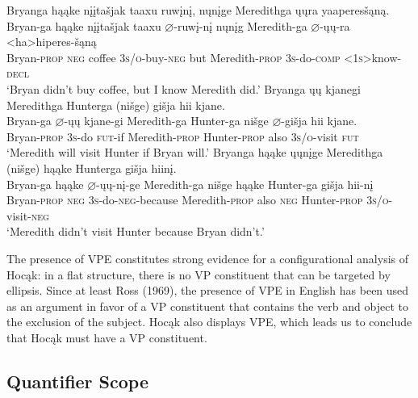 \documentclass[output=paper]{LSP/langsci}
\begin{document}
\begin{exe}
\ex
\begin{xlist}
\ex 
\glll Bryanga	h\k{a}\k{a}ke	{n\k{i}\k{i}ta\v{s}jak taaxu}		ruw\k{i}n\k{i},		n\k{u}n\k{i}ge		Meredithga \k{u}\k{u}ra 	yaaperes\v{s}\k{a}n\k{a}. \\
Bryan-ga h\k{a}\k{a}ke	{n\k{i}\k{i}ta\v{s}jak taaxu} $\varnothing$-ruw\k{i}-n\k{i} n\k{u}n\k{i}g	Meredith-ga $\varnothing$-\k{u}\k{u}-ra	<ha>hiperes-\v{s}\k{a}n\k{a} \\
Bryan-\textsc{prop}	\textsc{neg}	coffee	 \textsc{3s/o}-buy-\textsc{neg} but	 Meredith-\textsc{prop} \textsc{3s}-do-\textsc{comp}	\textsc{<1s>}know-\textsc{decl} \\
\trans `Bryan didn't buy coffee, but I know Meredith did.'
\ex 
\glll Bryanga	\k{u}\k{u}	kjanegi	Meredithga	Hunterga	(ni\v{s}ge)	 {gi\v{s}ja hii} kjane.\\
Bryan-ga	$\varnothing$-\k{u}\k{u}  kjane-gi	 Meredith-ga	Hunter-ga	ni\v{s}ge  {$\varnothing$-gi\v{s}ja hii} kjane. \\
Bryan-\textsc{prop} \textsc{3s}-do	\textsc{fut}-if	 Meredith-\textsc{prop} Hunter-\textsc{prop}	 also	 \textsc{3s/o}-visit	 \textsc{fut} \\
\trans `Meredith will visit Hunter if Bryan will.'
\ex 
\glll Bryanga			h\k{a}\k{a}ke	\k{u}\k{u}n\k{i}ge	Meredithga		(ni\v{s}ge)		h\k{a}\k{a}ke Hunterga	{gi\v{s}ja hiin\k{i}.}\\
Bryan-ga	h\k{a}\k{a}ke	$\varnothing$-\k{u}\k{u}-n\k{i}-ge	Meredith-ga	 ni\v{s}ge	h\k{a}\k{a}ke  Hunter-ga  {gi\v{s}ja hii-n\k{i}} \\
Bryan-\textsc{prop}	\textsc{neg}	\textsc{3s}-do-\textsc{neg}-because Meredith-\textsc{prop} also	\textsc{neg} Hunter-\textsc{prop} \textsc{3s/o}-visit-\textsc{neg} \\
\trans `Meredith didn't visit Hunter because Bryan didn't.'
\end{xlist}
\end{exe}

The presence of VPE constitutes strong evidence for a configurational analysis of Hoc\k{a}k: in a flat structure, there is no VP constituent that can be targeted by ellipsis. Since at least Ross (1969), the presence of VPE in English has been used as an argument in favor of a VP constituent that contains the verb and object to the exclusion of the subject. Hoc\k{a}k also displays VPE, which leads us to conclude that Hoc\k{a}k must have a VP constituent.

\subsection{Quantifier Scope}
\end{document}
